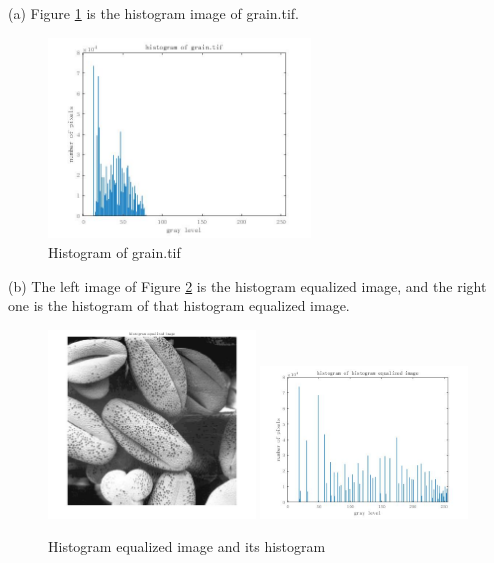 \problem{}
(a) Figure \ref{fig:p1a} is the histogram image of grain.tif.\\

\begin{figure}[htbp]
    \centering
	\includegraphics[width=0.62\textwidth]{../images/p1/p1a_historgram_origin.jpg}
    \caption{Histogram of grain.tif}
    \label{fig:p1a}
\end{figure}

(b) The left image of Figure \ref{fig:p1b} is the histogram equalized image, and the right one is 
the histogram of that histogram equalized image.\\

\begin{figure}[htbp]
    \centering
	\includegraphics[width=0.49\textwidth]{../images/p1/p1b_hist_eq_image.jpg}
	\includegraphics[width=0.49\textwidth]{../images/p1/p1b_historgram_hist_eq.jpg}
    \caption{Histogram equalized image and its histogram}
    \label{fig:p1b}
\end{figure}

